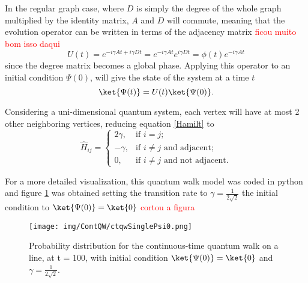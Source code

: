             	In the regular graph case, where $D$ is simply the degree of the whole graph multiplied by the identity matrix, $A$ and $D$ will commute, meaning that the evolution operator can be written in terms of the adjacency matrix \textcolor{red}{ficou muito bom isso daqui}
            	\begin{equation}
            	   U(t) = e^{-i\gamma A t + i\gamma D t} = e^{-i\gamma A t} e^{i\gamma D t} = \phi(t) e^{-i\gamma A t} 
            	\end{equation}
            	since the degree matrix becomes a global phase.
            	Applying this operator to an initial condition $\Psi(0)$, will give the state of the system at a time $t$
                \begin{equation}
                    \ket{\Psi(t)} = U(t)\ket{\Psi(0)}.
                \end{equation}\par
                Considering a uni-dimensional quantum system, each vertex will have at most 2 other neighboring vertices, reducing equation \ref{Hamilt} to
                \begin{equation}
                \hat{H}_{ij} = \begin{cases} 
                            2\gamma, & \mbox{if } i= j; \\ 
                            -\gamma, & \mbox{if } i\neq j\mbox{ and adjacent};\\
                            0, & \mbox{if } i\neq j\mbox{ and not adjacent}.
                        \end{cases}
                \end{equation}\par
                For a more detailed visualization, this quantum walk model was coded in python and figure \ref{fig:contdist0} was obtained setting the transition rate to $\gamma=\frac{1}{2\sqrt{2}}$ the initial condition to $\ket{\Psi(0)} = \ket{0}$ \textcolor{red}{cortou a figura}
                
                \begin{figure}[!h]
                    \centering
                    \texttt{[image: img/ContQW/ctqwSinglePsi0.png]}
                    \caption{Probability distribution for the continuous-time quantum walk on a line, at t = 100, with initial condition $\ket{\Psi(0)}=\ket{0}$ and $\gamma=\frac{1}{2\sqrt{2}}$.} 
                    \label{fig:contdist0}
                \end{figure}
                
